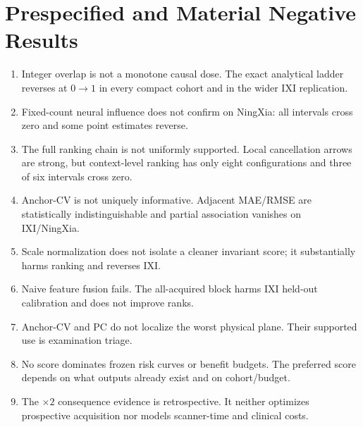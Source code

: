 \documentclass[10pt,twocolumn,letterpaper]{article}
\begin{document}
\section{Prespecified and Material Negative Results}
\label{sec:negative}
\begin{enumerate}
\item Integer overlap is not a monotone causal dose. The exact analytical ladder reverses at $0\to1$ in every compact cohort and in the wider IXI replication.
\item Fixed-count neural influence does not confirm on NingXia: all intervals cross zero and some point estimates reverse.
\item The full ranking chain is not uniformly supported. Local cancellation arrows are strong, but context-level ranking has only eight configurations and three of six intervals cross zero.
\item Anchor-CV is not uniquely informative. Adjacent MAE/RMSE are statistically indistinguishable and partial association vanishes on IXI/NingXia.
\item Scale normalization does not isolate a cleaner invariant score; it substantially harms ranking and reverses IXI.
\item Naive feature fusion fails. The all-acquired block harms IXI held-out calibration and does not improve ranks.
\item Anchor-CV and PC do not localize the worst physical plane. Their supported use is examination triage.
\item No score dominates frozen risk curves or benefit budgets. The preferred score depends on what outputs already exist and on cohort/budget.
\item The $\times2$ consequence evidence is retrospective. It neither optimizes prospective acquisition nor models scanner-time and clinical costs.
\end{enumerate}
\end{document}
